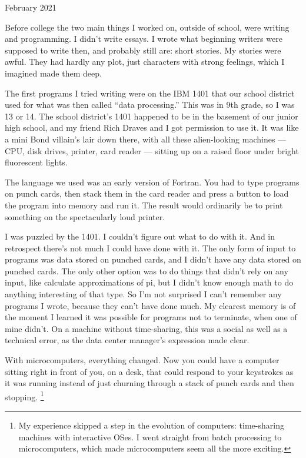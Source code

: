 \documentclass[12pt]{book}
\begin{document}
February 2021

Before college the two main things I worked on, outside of school, were
writing and programming. I didn't write essays. I wrote what beginning
writers were supposed to write then, and probably still are: short
stories. My stories were awful. They had hardly any plot, just
characters with strong feelings, which I imagined made them deep.

The first programs I tried writing were on the IBM 1401 that our school
district used for what was then called ``data processing.'' This was in
9th grade, so I was 13 or 14. The school district's 1401 happened to be
in the basement of our junior high school, and my friend Rich Draves and
I got permission to use it. It was like a mini Bond villain's lair down
there, with all these alien-looking machines --- CPU, disk drives,
printer, card reader --- sitting up on a raised floor under bright
fluorescent lights.

The language we used was an early version of Fortran. You had to type
programs on punch cards, then stack them in the card reader and press a
button to load the program into memory and run it. The result would
ordinarily be to print something on the spectacularly loud printer.

I was puzzled by the 1401. I couldn't figure out what to do with it. And
in retrospect there's not much I could have done with it. The only form
of input to programs was data stored on punched cards, and I didn't have
any data stored on punched cards. The only other option was to do things
that didn't rely on any input, like calculate approximations of pi, but
I didn't know enough math to do anything interesting of that type. So
I'm not surprised I can't remember any programs I wrote, because they
can't have done much. My clearest memory is of the moment I learned it
was possible for programs not to terminate, when one of mine didn't. On
a machine without time-sharing, this was a social as well as a technical
error, as the data center manager's expression made clear.

With microcomputers, everything changed. Now you could have a computer
sitting right in front of you, on a desk, that could respond to your
keystrokes as it was running instead of just churning through a stack of
punch cards and then stopping. \footnote{My experience skipped a step in the evolution of computers:
time-sharing machines with interactive OSes. I went straight from batch
processing to microcomputers, which made microcomputers seem all the
more exciting.}
\end{document}
